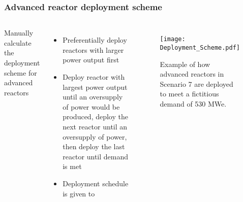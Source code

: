 \begin{frame}
    \frametitle{Advanced reactor deployment scheme}
    \begin{columns}
        \column[t]{5cm}
            Manually calculate the deployment scheme for advanced reactors
            \begin{itemize}
                \item Preferentially deploy reactors with larger power output first
                \item Deploy reactor with largest power output until an oversupply 
                      of power would be produced, deploy the next reactor until 
                      an oversupply of power, then deploy the last reactor until 
                      demand is met
                \item Deployment schedule is given to \Cyclus
            \end{itemize}
        \column[t]{5.5cm}
            \begin{figure}
                \texttt{[image: Deployment\_Scheme.pdf]}
                \caption{Example of how advanced reactors in Scenario 7 are deployed to 
                meet a fictitious demand of 530 MWe.}
                \label{fig:deployment}
            \end{figure}
                    
    \end{columns}
\end{frame}